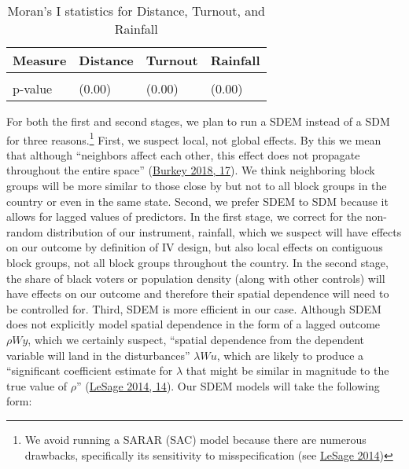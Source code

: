 \documentclass[
  12pt,
]{article}
\begin{document}
\begin{singlespace}
\begin{table}[H]

\caption{\label{tab:moran}\label{tab:morans} Moran's I statistics for Distance, Turnout, and Rainfall}
\centering
\begin{tabular}[t]{>{\raggedright\arraybackslash}p{15em}lll}
\toprule
Measure & Distance & Turnout & Rainfall\\
\midrule
\cellcolor{gray!6}{Moran's I} & \cellcolor{gray!6}{0.25} & \cellcolor{gray!6}{0.38} & \cellcolor{gray!6}{0.95}\\
p-value & (0.00) & (0.00) & (0.00)\\
\bottomrule
\end{tabular}
\end{table}
\end{singlespace}

For both the first and second stages, we plan to run a SDEM instead of a SDM for three reasons.\footnote{We avoid running a SARAR (SAC) model because there are numerous drawbacks, specifically its sensitivity to misspecification (see \protect\hyperlink{ref-LeSage2014}{LeSage 2014})} First, we suspect local, not global effects. By this we mean that although ``neighbors affect each other, this effect does not propagate throughout the entire space'' (\protect\hyperlink{ref-Burkey2018}{Burkey 2018, 17}). We think neighboring block groups will be more similar to those close by but not to all block groups in the country or even in the same state. Second, we prefer SDEM to SDM because it allows for lagged values of predictors. In the first stage, we correct for the non-random distribution of our instrument, rainfall, which we suspect will have effects on our outcome by definition of IV design, but also local effects on contiguous block groups, not all block groups throughout the country. In the second stage, the share of black voters or population density (along with other controls) will have effects on our outcome and therefore their spatial dependence will need to be controlled for. Third, SDEM is more efficient in our case. Although SDEM does not explicitly model spatial dependence in the form of a lagged outcome \(\rho{Wy}\), which we certainly suspect, ``spatial dependence from the dependent variable will land in the disturbances'' \(\lambda{Wu}\), which are likely to produce a ``significant coefficient estimate for \(\lambda\) that might be similar in magnitude to the true value of \(\rho\)'' (\protect\hyperlink{ref-LeSage2014}{LeSage 2014, 14}). Our SDEM models will take the following form:
\end{document}
